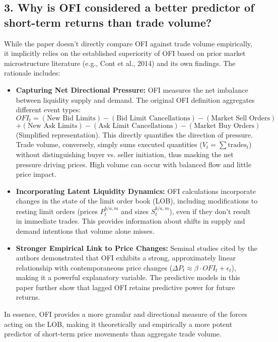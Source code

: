 \documentclass{article}
\begin{document}
\subsection*{3. Why is OFI considered a better predictor of short-term returns than trade volume?}

While the paper doesn't directly compare OFI against trade volume empirically, it implicitly relies on the established superiority of OFI based on prior market microstructure literature (e.g., Cont et al., 2014) and its own findings. The rationale includes:

\begin{itemize}
    \item \textbf{Capturing Net Directional Pressure:} OFI measures the net imbalance between liquidity supply and demand. The original OFI definition aggregates different event types:
    \[ OFI_t = (\text{New Bid Limits}) - (\text{Bid Limit Cancellations}) - (\text{Market Sell Orders}) \]
    \[ + (\text{New Ask Limits}) - (\text{Ask Limit Cancellations}) - (\text{Market Buy Orders}) \]
    (Simplified representation). This directly quantifies the direction of pressure. Trade volume, conversely, simply sums executed quantities ($V_t = \sum \text{trades}_t$) without distinguishing buyer vs. seller initiation, thus masking the net pressure driving prices. High volume can occur with balanced flow and little price impact.
    \item \textbf{Incorporating Latent Liquidity Dynamics:} OFI calculations incorporate changes in the state of the limit order book (LOB), including modifications to resting limit orders (prices $P^{b/a,m}_t$ and sizes $S^{b/a,m}_t$), even if they don't result in immediate trades. This provides information about shifts in supply and demand intentions that volume alone misses.
    \item \textbf{Stronger Empirical Link to Price Changes:} Seminal studies cited by the authors demonstrated that OFI exhibits a strong, approximately linear relationship with contemporaneous price changes ($\Delta P_t \approx \beta \cdot OFI_t + \epsilon_t$), making it a powerful explanatory variable. The predictive models in this paper further show that lagged OFI retains predictive power for future returns.
\end{itemize}
In essence, OFI provides a more granular and directional measure of the forces acting on the LOB, making it theoretically and empirically a more potent predictor of short-term price movements than aggregate trade volume.
\end{document}
